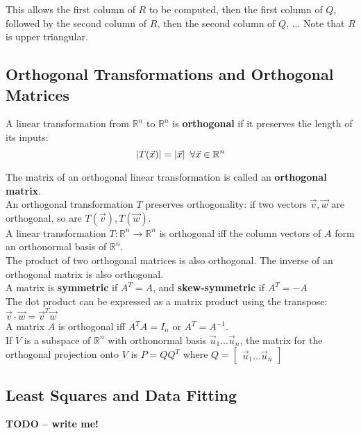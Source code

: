 \documentclass[]{scrartcl}
\begin{document}
	This allows the first column of $R$ to be computed, then the first column of $Q$, followed by the second column of $R$, then the second column of $Q$, ... Note that $R$ is upper triangular.
	
	\subsection{Orthogonal Transformations and Orthogonal Matrices}
	A linear transformation from $\mathbb{R}^n$ to $\mathbb{R}^n$ is \textbf{orthogonal} if it preserves the length of its inputs:
	$$
	\lvert T(\vec{x}) \rvert = \lvert \vec{x} \rvert \enskip \forall \vec{x} \in \mathbb{R}^n
	$$
	
	The matrix of an orthogonal linear transformation is called an \textbf{orthogonal matrix}.\\
	
	An orthogonal transformation $T$ preserves orthogonality: if two vectors $\vec{v}, \vec{w}$ are orthogonal, so are $T(\vec{v}), T(\vec{w})$.\\
	
	A linear transformation $T: \mathbb{R}^n \rightarrow \mathbb{R}^n$ is orthogonal iff the column vectors of $A$ form an orthonormal basis of $\mathbb{R}^n$.\\
	
	The product of two orthogonal matrices is also orthogonal. The inverse of an orthogonal matrix is also orthogonal.\\
	
	A matrix is \textbf{symmetric} if $A^T = A$, and \textbf{skew-symmetric} if $A^T = -A$\\
	
	The dot product can be expressed as a matrix product using the transpose: $\vec{v} \cdot \vec{w} = \vec{v}^T \vec{w}$\\
	
	A matrix $A$ is orthogonal iff $ A^T A = I_n$ or $A^T = A^{-1} $.\\
	
	If $V$ is a subspace of $\mathbb{R}^n$ with orthonormal basis $\vec{u}_1 \ldots \vec{u}_n$, the matrix for the orthogonal projection onto $V$ is $P = Q Q^T$ where $Q = \begin{bmatrix}
	\vec{u}_1 \ldots \vec{u}_n
	\end{bmatrix}$
	
	\subsection{Least Squares and Data Fitting}
	\textbf{TODO -- write me!}
	
\end{document}
